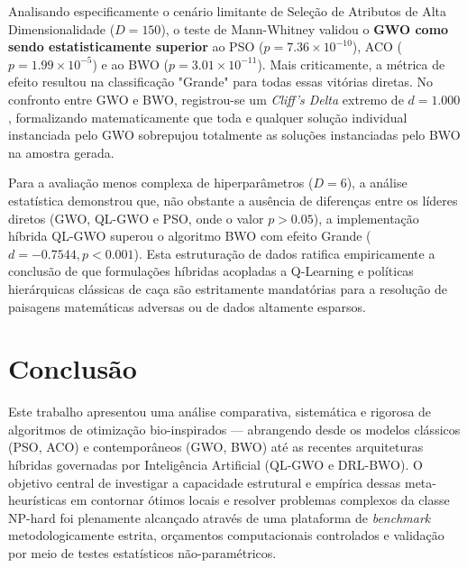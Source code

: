 \documentclass[12pt, a4paper, oneside]{report}
\begin{document}
Analisando especificamente o cenário limitante de Seleção de Atributos de Alta Dimensionalidade ($D=150$), o teste de Mann-Whitney validou o \textbf{GWO como sendo estatisticamente superior} ao PSO ($p = 7.36 \times 10^{-10}$), ACO ($p = 1.99 \times 10^{-5}$) e ao BWO ($p = 3.01 \times 10^{-11}$). Mais criticamente, a métrica de efeito resultou na classificação "Grande" para todas essas vitórias diretas. No confronto entre GWO e BWO, registrou-se um \textit{Cliff's Delta} extremo de $d = 1.000$, formalizando matematicamente que toda e qualquer solução individual instanciada pelo GWO sobrepujou totalmente as soluções instanciadas pelo BWO na amostra gerada. 

Para a avaliação menos complexa de hiperparâmetros ($D=6$), a análise estatística demonstrou que, não obstante a ausência de diferenças entre os líderes diretos (GWO, QL-GWO e PSO, onde o valor $p > 0.05$), a implementação híbrida QL-GWO superou o algoritmo BWO com efeito Grande ($d = -0.7544, p < 0.001$). Esta estruturação de dados ratifica empiricamente a conclusão de que formulações híbridas acopladas a Q-Learning e políticas hierárquicas clássicas de caça são estritamente mandatórias para a resolução de paisagens matemáticas adversas ou de dados altamente esparsos.


\chapter{Conclusão} \label{chap:conclusao}


Este trabalho apresentou uma análise comparativa, sistemática e rigorosa de algoritmos de otimização bio-inspirados — abrangendo desde os modelos clássicos (PSO, ACO) e contemporâneos (GWO, BWO) até as recentes arquiteturas híbridas governadas por Inteligência Artificial (QL-GWO e DRL-BWO). O objetivo central de investigar a capacidade estrutural e empírica dessas meta-heurísticas em contornar ótimos locais e resolver problemas complexos da classe NP-hard foi plenamente alcançado através de uma plataforma de \textit{benchmark} metodologicamente estrita, orçamentos computacionais controlados e validação por meio de testes estatísticos não-paramétricos.
\end{document}

